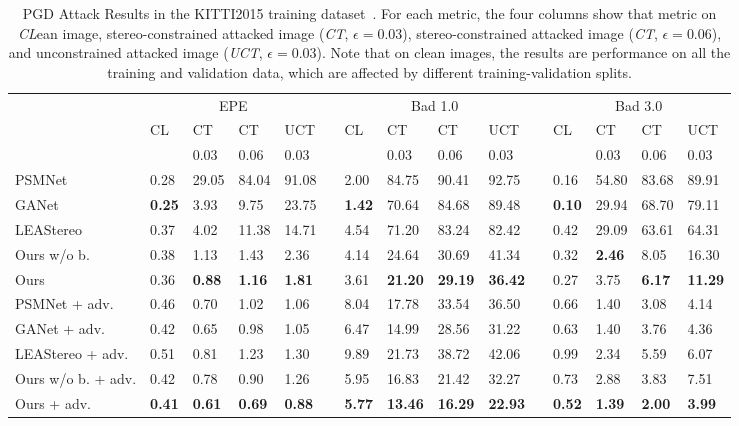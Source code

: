 \documentclass[10pt,twocolumn,letterpaper]{article}
\begin{document}
\begin{table*} [t]
\begin{center}
{\small
\begin{tabular*}{0.95\textwidth}{@{\extracolsep{\fill}}lllllllllllllll}
\toprule
& \multicolumn{4}{c}{EPE} & &\multicolumn{4}{c}{Bad 1.0} & &\multicolumn{4}{c}{Bad 3.0}   \\
\cline{2-5} \cline{7-10} \cline{12-15}
&CL &CT &CT  &UCT &  &CL &CT  &CT  &UCT  &&CL &CT  &CT  &UCT \\
& &$0.03$ &$0.06$ &$0.03$ & & &$0.03$ &$0.06$ &$0.03$ & & &$0.03$ &$0.06$ &$0.03$\\
\midrule
PSMNet & 0.28 & 29.05 & 84.04 & 91.08 &&2.00 & 84.75 & 90.41 & 92.75 && 0.16 & 54.80 & 83.68 & 89.91 \\
GANet & \textbf{0.25} & 3.93 & 9.75 & 23.75 && \textbf{1.42} & 70.64 & 84.68 &89.48 && \textbf{0.10} & 29.94 & 68.70 &79.11 \\
LEAStereo & 0.37 & 4.02 & 11.38 & 14.71 && 4.54 & 71.20 & 83.24 & 82.42 && 0.42 & 29.09 & 63.61 & 64.31 \\
\cline{2-5} \cline{7-10} \cline{12-15}

Ours w/o b. & 0.38 & 1.13 & 1.43 & 2.36 && 4.14 & 24.64 & 30.69 & 41.34 && 0.32 & \textbf{2.46} & 8.05 & 16.30 \\
Ours & 0.36 & \textbf{0.88} & \textbf{1.16} & \textbf{1.81} && 3.61 & \textbf{21.20} & \textbf{29.19} & \textbf{36.42} && 0.27 & 3.75 & \textbf{6.17} & \textbf{11.29} \\
\toprule
PSMNet + adv.  & 0.46 & 0.70 & 1.02 & 1.06 && 8.04 & 17.78 & 33.54 & 36.50 && 0.66 & 1.40 & 3.08 & 4.14 \\
GANet + adv. & 0.42 & 0.65 & 0.98 & 1.05 && 6.47 & 14.99 & 28.56 & 31.22 && 0.63 & 1.40 & 3.76 & 4.36 \\
LEAStereo + adv.  & 0.51 & 0.81 & 1.23 & 1.30 && 9.89 &21.73 &38.72 &42.06 && 0.99 &2.34 &5.59 &6.07 \\
\cline{2-5} \cline{7-10} \cline{12-15}
Ours w/o b. + adv.  & 0.42 &0.78 &0.90 &1.26 && 5.95 &16.83 &21.42 &32.27 && 0.73 &2.88 &3.83 &7.51 \\
Ours + adv.  & \textbf{0.41} &\textbf{0.61} &\textbf{0.69} &\textbf{0.88} && \textbf{5.77} &\textbf{13.46} &\textbf{16.29} &\textbf{22.93} && \textbf{0.52} &\textbf{1.39} &\textbf{2.00} &\textbf{3.99} \\
\bottomrule
\end{tabular*}}
\end{center}
\caption[PGD Attack Results in the KITTI2015 training dataset~\cite{Menze2015CVPR}.]{PGD Attack Results in the KITTI2015 training dataset~\cite{Menze2015CVPR}. For each metric, the four columns show that metric on \textit{CL}ean image, stereo-constrained attacked image (\textit{CT}, $\epsilon=0.03$), stereo-constrained attacked image (\textit{CT}, $\epsilon=0.06$), and unconstrained attacked image (\textit{UCT}, $\epsilon=0.03$). Note that on clean images, the results are performance on all the training and validation data, which are affected by different training-validation splits.}
\label{table:kitti15_attack_results}
\end{table*}
\end{document}
